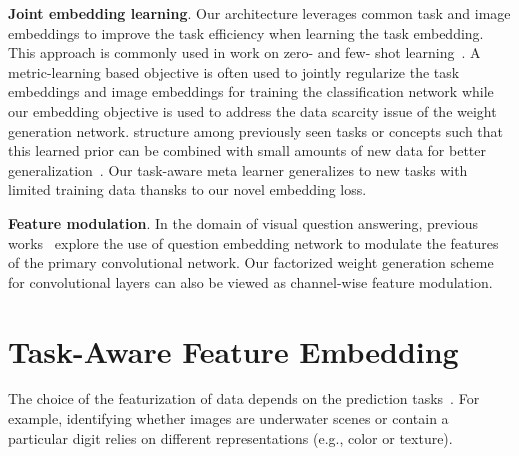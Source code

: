 \documentclass[10pt,twocolumn,letterpaper]{article}
\newcommand{\xin}[1]{\textcolor{red}{[Xin: #1]}}
\newcommand{\joey}[1]{\textcolor{blue}{[Joey: #1]}}
\newcommand\minisection[1]{\vspace{2mm}\noindent \textbf{#1}}
\begin{document}
\minisection{Joint embedding learning}. Our architecture leverages common task and 
image embeddings to improve the task efficiency when learning the task 
embedding. This approach is commonly used in work on zero- and few- shot learning~\cite{koch2015siamese, yang2018learning, vinyals2016matching, zhang2016zero, Changpinyo_2016_CVPR, frome2013devise}. 
A metric-learning based objective \cite{koch2015siamese, yang2018learning, vinyals2016matching} is often used to jointly regularize the task embeddings and 
image embeddings for training the classification network while our embedding objective is 
used to address the data scarcity issue of the weight generation network.
structure among previously seen tasks or concepts such that this learned prior can be combined with small amounts of new data for better generalization~\cite{finn2018learning}.  
Our task-aware meta learner generalizes to new tasks with limited training data 
thansks to our novel embedding loss. 

\minisection{Feature modulation}. In the domain of visual question answering, previous works~\cite{perez2018film, de2017modulating} explore the use of question embedding network 
to modulate the features of the primary convolutional network. Our factorized weight generation
scheme for convolutional layers can also be viewed as channel-wise feature modulation. 

\section{Task-Aware Feature Embedding}

The choice of the featurization of data depends on the prediction tasks~\cite{donahue2014decaf, girshick2014rich}.
For example, identifying whether images are underwater scenes or contain a particular digit relies on different representations (e.g., color or texture). 
\end{document}
